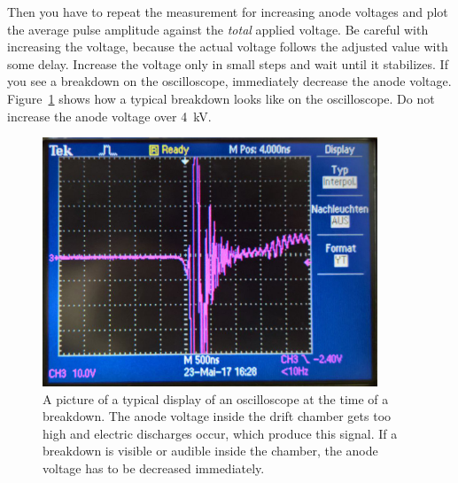 \documentclass[12pt]{article}
\begin{document}

Then you have to repeat the measurement for increasing anode voltages and plot the average pulse amplitude against the \emph{total} applied voltage. Be careful with increasing the voltage, because the actual voltage follows the adjusted value with some delay. Increase the voltage only in small steps and wait until it stabilizes. If you see a breakdown on the oscilloscope, immediately decrease the anode voltage. Figure~\ref{fig:breakdown} shows how a typical breakdown looks like on the oscilloscope. Do not increase the anode voltage over \SI{4}{\kilo\volt}. 

\begin{figure}[h]
\includegraphics[width=10cm]{pics/breakdown}
\centering
\caption{A picture of a typical display of an oscilloscope at the time of a breakdown. The anode voltage inside the drift chamber gets too high and electric discharges occur, which produce this signal. If a breakdown is visible or audible inside the chamber, the anode voltage has to be decreased immediately.}
\label{fig:breakdown}
\end{figure}
\end{document}
